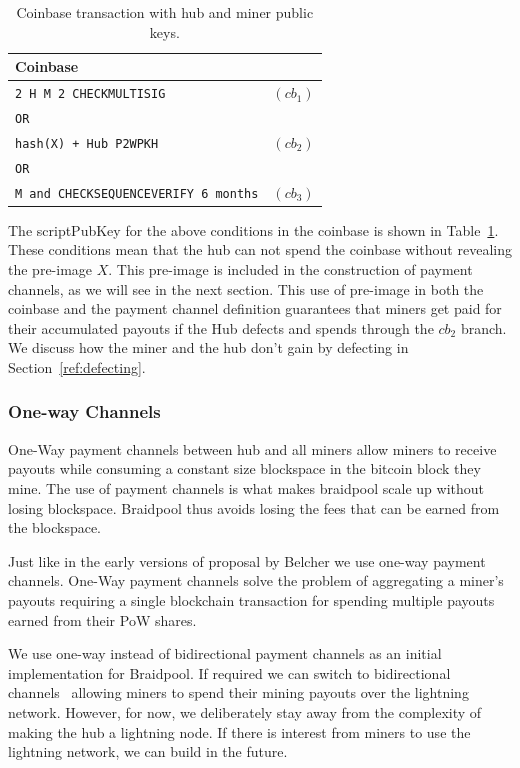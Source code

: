 \documentclass{article}
\begin{document}
\begin{table}
  \centering
  \begin{tabular}{ lr }
    \bfseries Coinbase \\
    \midrule
    \verb|2 H M 2 CHECKMULTISIG| & $(cb_1)$ \\
    \verb|OR| \\
    \verb|hash(X) + Hub P2WPKH| & $(cb_2)$ \\
    \verb|OR| \\
    \verb|M and CHECKSEQUENCEVERIFY 6 months| & $(cb_3)$\\ 
    \midrule
  \end{tabular}
  \caption{Coinbase transaction with hub and miner public keys.}\label{table:coinbase}
\end{table}

The scriptPubKey for the above conditions in the coinbase is shown in
Table~\ref{table:coinbase}. These conditions mean that the hub can not
spend the coinbase without revealing the pre-image $X$. This pre-image
is included in the construction of payment channels, as we will see in
the next section. This use of pre-image in both the coinbase and the
payment channel definition guarantees that miners get paid for their
accumulated payouts if the Hub defects and spends through the $cb_2$
branch. We discuss how the miner and the hub don't gain by defecting
in Section~\ref{ref:defecting}.

\subsubsection{One-way Channels}

One-Way payment channels between hub and all miners allow miners to
receive payouts while consuming a constant size blockspace in the
bitcoin block they mine. The use of payment channels is what makes
braidpool scale up without losing blockspace. Braidpool thus avoids
losing the fees that can be earned from the blockspace.

Just like in the early versions of proposal by Belcher we use one-way
payment channels. One-Way payment channels solve the problem of
aggregating a miner's payouts requiring a single blockchain
transaction for spending multiple payouts earned from their PoW
shares.

We use one-way instead of bidirectional payment channels as an initial
implementation for Braidpool. If required we can switch to
bidirectional channels~\cite{poon2016bitcoin} allowing miners to spend
their mining payouts over the lightning network. However, for now, we
deliberately stay away from the complexity of making the hub a
lightning node. If there is interest from miners to use the lightning
network, we can build in the future.
\end{document}
